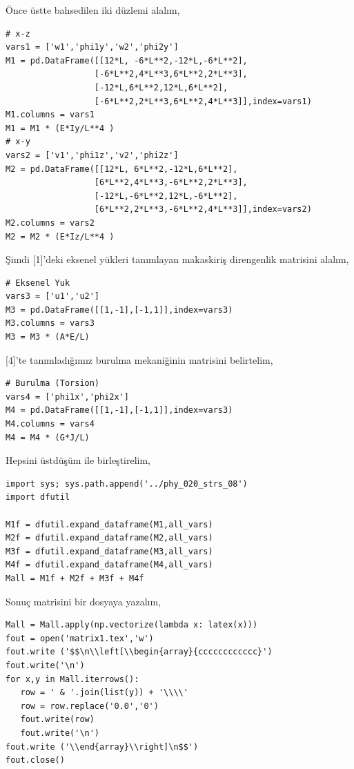 \documentclass[12pt,fleqn]{article}\usepackage{../../common}
\begin{document}
Önce üstte bahsedilen iki düzlemi alalım,

\begin{verbatim}
# x-z
vars1 = ['w1','phi1y','w2','phi2y']
M1 = pd.DataFrame([[12*L, -6*L**2,-12*L,-6*L**2],
                  [-6*L**2,4*L**3,6*L**2,2*L**3],
                  [-12*L,6*L**2,12*L,6*L**2],
                  [-6*L**2,2*L**3,6*L**2,4*L**3]],index=vars1)
M1.columns = vars1
M1 = M1 * (E*Iy/L**4 )
# x-y
vars2 = ['v1','phi1z','v2','phi2z']
M2 = pd.DataFrame([[12*L, 6*L**2,-12*L,6*L**2],
                  [6*L**2,4*L**3,-6*L**2,2*L**3],
                  [-12*L,-6*L**2,12*L,-6*L**2],
                  [6*L**2,2*L**3,-6*L**2,4*L**3]],index=vars2)
M2.columns = vars2
M2 = M2 * (E*Iz/L**4 )
\end{verbatim}

Şimdi [1]'deki eksenel yükleri tanımlayan makaskiriş direngenlik matrisini
alalım,

\begin{verbatim}
# Eksenel Yuk
vars3 = ['u1','u2']
M3 = pd.DataFrame([[1,-1],[-1,1]],index=vars3)
M3.columns = vars3
M3 = M3 * (A*E/L)
\end{verbatim}

[4]'te tanımladığımız burulma mekaniğinin matrisini belirtelim,

\begin{verbatim}
# Burulma (Torsion)
vars4 = ['phi1x','phi2x']
M4 = pd.DataFrame([[1,-1],[-1,1]],index=vars3)
M4.columns = vars4
M4 = M4 * (G*J/L)
\end{verbatim}

Hepsini üstdüşüm ile birleştirelim,

\begin{verbatim}
import sys; sys.path.append('../phy_020_strs_08')
import dfutil

M1f = dfutil.expand_dataframe(M1,all_vars)
M2f = dfutil.expand_dataframe(M2,all_vars)
M3f = dfutil.expand_dataframe(M3,all_vars)
M4f = dfutil.expand_dataframe(M4,all_vars)
Mall = M1f + M2f + M3f + M4f
\end{verbatim}

Sonuç matrisini bir dosyaya yazalım, 

\begin{verbatim}
Mall = Mall.apply(np.vectorize(lambda x: latex(x)))
fout = open('matrix1.tex','w')
fout.write ('$$\n\\left[\\begin{array}{cccccccccccc}')
fout.write('\n')
for x,y in Mall.iterrows():
   row = ' & '.join(list(y)) + '\\\\'
   row = row.replace('0.0','0')
   fout.write(row)
   fout.write('\n')
fout.write ('\\end{array}\\right]\n$$')
fout.close()
\end{verbatim}
\end{document}
